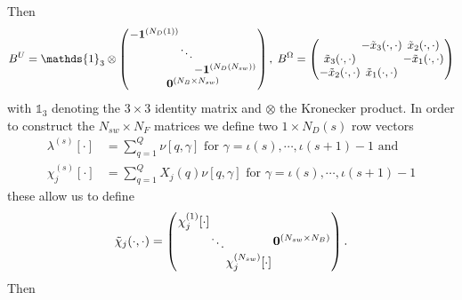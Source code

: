 Then
\begin{equation*}
\arraycolsep=0.4pt\def\arraystretch{1}
    B^U = \mathds{1}_{3} \otimes \left(\begin{array}{c}
         \begin{array}{ccc}
             -\bm{1}^{(N_D(1))} & & \\
              & \ddots & \\
              & & -\bm{1}^{(N_D(N_{sw}))}
         \end{array}\\
         \bm{0}^{(N_B \times N_{sw})}
    \end{array}\right), \;
    B^\Omega =
    \left(\begin{array}{ccc}
             & -\tilde{x}_3(\cdot,\cdot) & \tilde{x}_2(\cdot,\cdot)\\
            \tilde{x}_3(\cdot,\cdot) & & -\tilde{x}_1(\cdot,\cdot)\\
            -\tilde{x}_2(\cdot,\cdot) & \tilde{x}_1(\cdot,\cdot) &
          \end{array}\right)
\end{equation*}
with $\mathds{1}_{3}$ denoting the $3\times3$ identity matrix and $\otimes$ the Kronecker product.
In order to construct the $N_{sw} \times N_F$ matrices we define two $1 \times N_D(s)$ row vectors
\begin{equation*}
\begin{aligned}
    \lambda^{(s)}[\cdot] &= \sum_{q=1}^Q \nu[q,\gamma] \text{ for } \gamma = \iota(s),\cdots,\iota(s+1)-1 \text{ and } \\
    \chi_j^{(s)}[\cdot] &= \sum_{q=1}^{Q} X_j(q)\nu[q,\gamma] \text{ for } \gamma = \iota(s),\cdots,\iota(s+1)-1
\end{aligned}
\end{equation*}
these allow us to define
\begin{equation*}
\arraycolsep=0.4pt\def\arraystretch{1}
    \tilde{\chi}_j(\cdot,\cdot)=\left(\begin{array}{cc}
         \begin{array}{ccc}
             \chi_j^{(1)}[\cdot] & & \\
              & \ddots & \\
              & & \chi_j^{(N_{sw})}[\cdot]
         \end{array} & \bm{0}^{(N_{sw} \times N_B)}
    \end{array}\right).
\end{equation*}
Then
